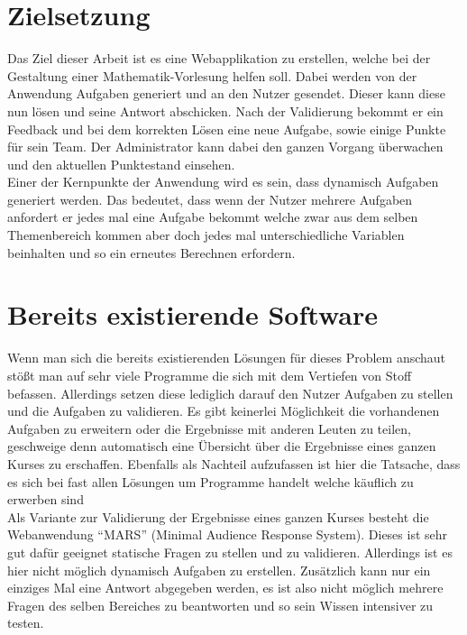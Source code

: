 \section{Zielsetzung}

Das Ziel dieser Arbeit ist es eine Webapplikation zu erstellen, welche bei der Gestaltung einer Mathematik-Vorlesung helfen soll. Dabei werden von der Anwendung Aufgaben generiert und an den Nutzer gesendet. Dieser kann diese nun lösen und seine Antwort abschicken. Nach der Validierung bekommt er ein Feedback und bei dem korrekten Lösen eine neue Aufgabe, sowie einige Punkte für sein Team. Der Administrator kann dabei den ganzen Vorgang überwachen und den aktuellen Punktestand einsehen. \\
Einer der Kernpunkte der Anwendung wird es sein, dass dynamisch Aufgaben generiert werden. Das bedeutet, dass wenn der Nutzer mehrere Aufgaben anfordert er jedes mal eine Aufgabe bekommt welche zwar aus dem selben Themenbereich kommen aber doch jedes mal unterschiedliche Variablen beinhalten und so ein erneutes Berechnen erfordern.


\section{Bereits existierende Software}

Wenn man sich die bereits existierenden Lösungen für dieses Problem anschaut stößt man auf sehr viele Programme die sich mit dem Vertiefen von Stoff befassen. Allerdings setzen diese lediglich darauf den Nutzer Aufgaben zu stellen und die Aufgaben zu validieren. Es gibt keinerlei Möglichkeit die vorhandenen Aufgaben zu erweitern oder die Ergebnisse mit anderen Leuten zu teilen, geschweige denn automatisch eine Übersicht über die Ergebnisse eines ganzen Kurses zu erschaffen. Ebenfalls als Nachteil aufzufassen ist hier die Tatsache, dass es sich bei fast allen Lösungen um Programme handelt welche käuflich zu erwerben sind\\

Als Variante zur Validierung der Ergebnisse eines ganzen Kurses besteht die Webanwendung ``MARS'' (Minimal Audience Response System). Dieses ist sehr gut dafür geeignet statische Fragen zu stellen und zu validieren. Allerdings ist es hier nicht möglich dynamisch Aufgaben zu erstellen. Zusätzlich kann nur ein einziges Mal eine Antwort abgegeben werden, es ist also nicht möglich mehrere Fragen des selben Bereiches zu beantworten und so sein Wissen intensiver zu testen. \\

